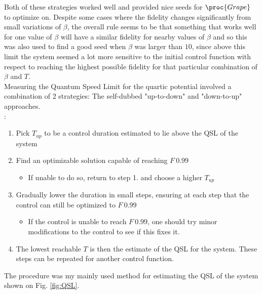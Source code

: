 \documentclass[a4paper, twocolumn]{revtex4-1}
\begin{document}
Both of these strategies worked well and provided nice seeds for $\proc{Grape}$ to optimize on. Despite some cases where the fidelity changes significantly from small variations of $\beta$, the overall rule seems to be that something that works well for one value of $\beta$ will have a similar fidelity for nearby values of $\beta$ and so this was also used to find a good seed when $\beta$ was larger than $10$, since above this limit the system seemed a lot more sensitive to the initial control function with respect to reaching the highest possible fidelity for that particular combination of $\beta$ and $T$. \\

Measuring the Quantum Speed Limit for the quartic potential involved a combination of 2 strategies: The self-dubbed "up-to-down" and "down-to-up" approaches. \\

:
\begin{enumerate}
	\item Pick $T_{up}$ to be a control duration estimated to lie above the QSL of the system
	\item Find an optimizable solution capable of reaching $F~0.99$
	\begin{itemize}
		\item If unable to do so, return to step 1. and choose a higher $T_{up}$
	\end{itemize}
	\item Gradually lower the duration in small steps, ensuring at each step that the control can still be optimized to $F~0.99$
	\begin{itemize}
		\item If the control is unable to reach $F~0.99$, one should try minor modifications to the control to see if this fixes it.
	\end{itemize}
	\item The lowest reachable $T$ is then the estimate of the QSL for the system. These steps can be repeated for another control function.
\end{enumerate}
The  procedure was my mainly used method for estimating the QSL of the system shown on Fig. \ref{fig:QSL}.\\
\end{document}
